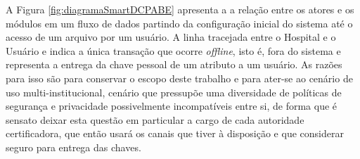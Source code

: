 \documentclass[a4paper,11pt]{article}
\begin{document}

A Figura \ref{fig:diagramaSmartDCPABE} apresenta a a relação entre os atores e os módulos em um fluxo de dados partindo da configuração inicial do sistema até o acesso de um arquivo por um usuário.
A linha tracejada entre o Hospital e o Usuário e indica a única transação que ocorre \emph{offline}, isto é, fora do sistema e representa a entrega da chave pessoal de um atributo a um usuário.
As razões para isso são para conservar o escopo deste trabalho e para ater-se ao cenário de uso multi-institucional, cenário que pressupõe uma diversidade de políticas de segurança e privacidade possivelmente incompatíveis entre si, de forma que é sensato deixar esta questão em particular a cargo de cada autoridade certificadora, que então usará os canais que tiver à disposição e que considerar seguro para entrega das chaves.
\end{document}
